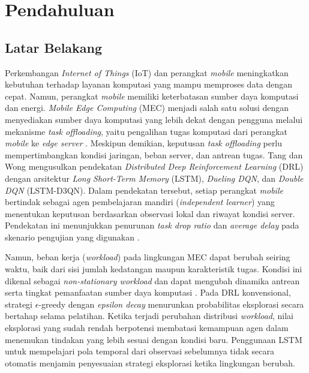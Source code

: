 \chapter{Pendahuluan}

\section{Latar Belakang}
\label{sec:latar_belakang}

Perkembangan \textit{Internet of Things} (IoT) dan perangkat \textit{mobile} meningkatkan kebutuhan terhadap layanan komputasi yang mampu memproses data dengan cepat. Namun, perangkat \textit{mobile} memiliki keterbatasan sumber daya komputasi dan energi. \textit{Mobile Edge Computing} (MEC) menjadi salah satu solusi dengan menyediakan sumber daya komputasi yang lebih dekat dengan pengguna melalui mekanisme \textit{task offloading}, yaitu pengalihan tugas komputasi dari perangkat \textit{mobile} ke \textit{edge server} \cite{yousefpour2019all, acheampong2023review}. Meskipun demikian, keputusan \textit{task offloading} perlu mempertimbangkan kondisi jaringan, beban server, dan antrean tugas. Tang dan Wong \cite{tang2022deep} mengusulkan pendekatan \textit{Distributed Deep Reinforcement Learning} (DRL) dengan arsitektur \textit{Long Short-Term Memory} (LSTM), \textit{Dueling DQN}, dan \textit{Double DQN} (LSTM-D3QN). Dalam pendekatan tersebut, setiap perangkat \textit{mobile} bertindak sebagai agen pembelajaran mandiri (\textit{independent learner}) yang menentukan keputusan berdasarkan observasi lokal dan riwayat kondisi server. Pendekatan ini menunjukkan penurunan \textit{task drop ratio} dan \textit{average delay} pada skenario pengujian yang digunakan \cite{tang2022deep}.

Namun, beban kerja (\textit{workload}) pada lingkungan MEC dapat berubah seiring waktu, baik dari sisi jumlah kedatangan maupun karakteristik tugas. Kondisi ini dikenal sebagai \textit{non-stationary workload} dan dapat mengubah dinamika antrean serta tingkat pemanfaatan sumber daya komputasi \cite{padakandla2020reinforcement}. Pada DRL konvensional, strategi $\epsilon$-greedy dengan \textit{epsilon decay} menurunkan probabilitas eksplorasi secara bertahap selama pelatihan. Ketika terjadi perubahan distribusi \textit{workload}, nilai eksplorasi yang sudah rendah berpotensi membatasi kemampuan agen dalam menemukan tindakan yang lebih sesuai dengan kondisi baru. Penggunaan LSTM untuk mempelajari pola temporal dari observasi sebelumnya tidak secara otomatis menjamin penyesuaian strategi eksplorasi ketika lingkungan berubah.

